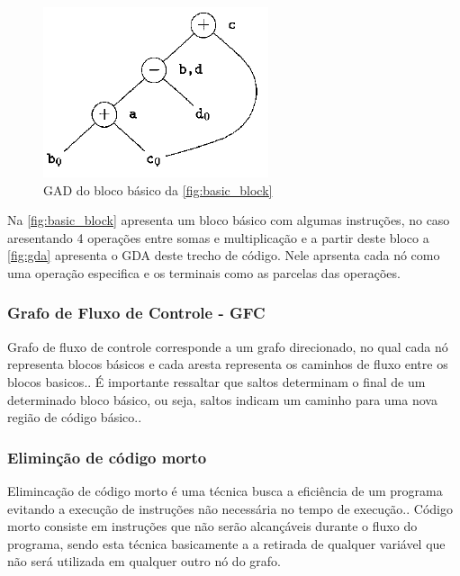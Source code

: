 \begin{figure}[htb]
	\begin{center}
    \caption{\label{fig:gda}GAD do bloco básico da \autoref{fig:basic_block}}
	\includegraphics[scale=0.40]{Figuras/GDA.png}
	\end{center}
\end{figure}

Na \autoref{fig:basic_block} apresenta um bloco básico com algumas instruções, no caso aresentando 4 operações entre somas e multiplicação e a partir deste bloco a \autoref{fig:gda} apresenta o GDA deste trecho de código. Nele aprsenta cada nó como uma operação especifica e os terminais como as parcelas das operações.

\subsubsection{Grafo de Fluxo de Controle - GFC}
\par
Grafo de fluxo de controle corresponde a um grafo direcionado, no qual cada nó representa blocos básicos e cada aresta representa os caminhos de fluxo entre os blocos basicos.\cite{allen1970control}. É importante ressaltar que saltos determinam o final de um determinado bloco básico, ou seja, saltos indicam um caminho para uma nova região de código básico.\cite{aho2007compilers}.


\subsubsection{Eliminção de código morto}
\par
Elimincação de código morto é uma técnica busca a eficiência de um programa evitando a execução de instruções não necessária no tempo de execução.\cite{knoop1994partial}. Código morto consiste em instruções que não serão alcançáveis durante o fluxo do programa, sendo esta técnica basicamente a a retirada de qualquer variável que não será utilizada em qualquer outro nó do grafo\cite{aho2007compilers}.

